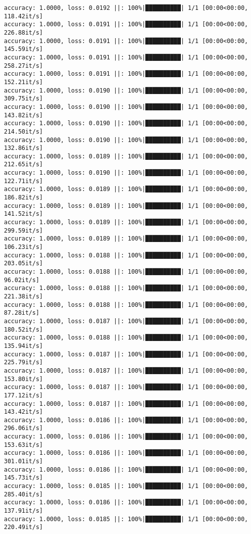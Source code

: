 \documentclass[
]{article}
\begin{document}
\begin{verbatim}
accuracy: 1.0000, loss: 0.0192 ||: 100%|██████████| 1/1 [00:00<00:00, 118.42it/s]
accuracy: 1.0000, loss: 0.0191 ||: 100%|██████████| 1/1 [00:00<00:00, 226.88it/s]
accuracy: 1.0000, loss: 0.0191 ||: 100%|██████████| 1/1 [00:00<00:00, 145.59it/s]
accuracy: 1.0000, loss: 0.0191 ||: 100%|██████████| 1/1 [00:00<00:00, 258.27it/s]
accuracy: 1.0000, loss: 0.0191 ||: 100%|██████████| 1/1 [00:00<00:00, 152.21it/s]
accuracy: 1.0000, loss: 0.0190 ||: 100%|██████████| 1/1 [00:00<00:00, 309.75it/s]
accuracy: 1.0000, loss: 0.0190 ||: 100%|██████████| 1/1 [00:00<00:00, 143.82it/s]
accuracy: 1.0000, loss: 0.0190 ||: 100%|██████████| 1/1 [00:00<00:00, 214.50it/s]
accuracy: 1.0000, loss: 0.0190 ||: 100%|██████████| 1/1 [00:00<00:00, 132.86it/s]
accuracy: 1.0000, loss: 0.0189 ||: 100%|██████████| 1/1 [00:00<00:00, 212.65it/s]
accuracy: 1.0000, loss: 0.0190 ||: 100%|██████████| 1/1 [00:00<00:00, 122.71it/s]
accuracy: 1.0000, loss: 0.0189 ||: 100%|██████████| 1/1 [00:00<00:00, 186.82it/s]
accuracy: 1.0000, loss: 0.0189 ||: 100%|██████████| 1/1 [00:00<00:00, 141.52it/s]
accuracy: 1.0000, loss: 0.0189 ||: 100%|██████████| 1/1 [00:00<00:00, 299.59it/s]
accuracy: 1.0000, loss: 0.0189 ||: 100%|██████████| 1/1 [00:00<00:00, 106.23it/s]
accuracy: 1.0000, loss: 0.0188 ||: 100%|██████████| 1/1 [00:00<00:00, 203.05it/s]
accuracy: 1.0000, loss: 0.0188 ||: 100%|██████████| 1/1 [00:00<00:00, 96.02it/s]
accuracy: 1.0000, loss: 0.0188 ||: 100%|██████████| 1/1 [00:00<00:00, 221.38it/s]
accuracy: 1.0000, loss: 0.0188 ||: 100%|██████████| 1/1 [00:00<00:00, 87.28it/s]
accuracy: 1.0000, loss: 0.0187 ||: 100%|██████████| 1/1 [00:00<00:00, 180.52it/s]
accuracy: 1.0000, loss: 0.0188 ||: 100%|██████████| 1/1 [00:00<00:00, 135.94it/s]
accuracy: 1.0000, loss: 0.0187 ||: 100%|██████████| 1/1 [00:00<00:00, 225.79it/s]
accuracy: 1.0000, loss: 0.0187 ||: 100%|██████████| 1/1 [00:00<00:00, 153.80it/s]
accuracy: 1.0000, loss: 0.0187 ||: 100%|██████████| 1/1 [00:00<00:00, 177.12it/s]
accuracy: 1.0000, loss: 0.0187 ||: 100%|██████████| 1/1 [00:00<00:00, 143.42it/s]
accuracy: 1.0000, loss: 0.0186 ||: 100%|██████████| 1/1 [00:00<00:00, 296.06it/s]
accuracy: 1.0000, loss: 0.0186 ||: 100%|██████████| 1/1 [00:00<00:00, 153.63it/s]
accuracy: 1.0000, loss: 0.0186 ||: 100%|██████████| 1/1 [00:00<00:00, 301.01it/s]
accuracy: 1.0000, loss: 0.0186 ||: 100%|██████████| 1/1 [00:00<00:00, 145.73it/s]
accuracy: 1.0000, loss: 0.0185 ||: 100%|██████████| 1/1 [00:00<00:00, 285.40it/s]
accuracy: 1.0000, loss: 0.0186 ||: 100%|██████████| 1/1 [00:00<00:00, 137.91it/s]
accuracy: 1.0000, loss: 0.0185 ||: 100%|██████████| 1/1 [00:00<00:00, 220.49it/s]

\end{verbatim}
\end{document}
